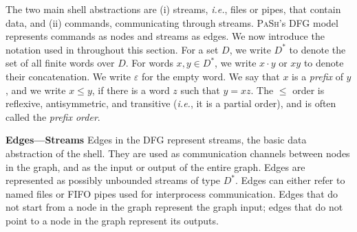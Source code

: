 \documentclass[sigplan, review, screen, anonymous]{acmart}
\newcommand{\ie}{{\em i.e.}, }
\newcommand{\heading}[1]{\vspace{4pt}\noindent\textbf{#1}\enspace}
\newcommand{\TODO}[1]{\hl{\textbf{TODO:} #1}\xspace}
\newcommand{\nv}[1]{[{\color{cyan}nv: #1}]}
\newcommand{\tr}[1]{} %
\newcommand{\kstar}{^{\textstyle *}}
\newcommand{\eps}{\varepsilon}
\newcommand{\sys}{{\scshape PaSh}\xspace}
\begin{document}
The two main shell abstractions are
  (i) streams, \ie files or pipes, that contain data, and
  (ii) commands, communicating through streams.
\sys's DFG model represents commands as nodes and streams as edges.
We now introduce the notation used in throughout this section.
For a set $D$, we write $D\kstar$ to denote the set of all finite words over $D$.
For words $x, y \in D\kstar$, we write $x \cdot y$ or $xy$ to denote their concatenation.
We write $\eps$ for the empty word.
We say that $x$ is a \emph{prefix} of $y$, and we write $x \leq y$, if there is a word $z$ such that $y = xz$.
The $\leq$ order is reflexive, antisymmetric, and transitive (\ie it is a partial order), and is often called the \emph{prefix order}.


\heading{Edges---Streams}
Edges in the DFG represent streams, the basic data abstraction of the shell.
They are used as communication channels between nodes in the graph, and as the input or output of the entire graph.
Edges are represented as possibly unbounded streams of type $D\kstar$.
Edges can either refer to named files or FIFO pipes used for interprocess communication.
Edges that do not start from a node in the graph represent the graph input;
  edges that do not point to a node in the graph represent its outputs.





\end{document}
